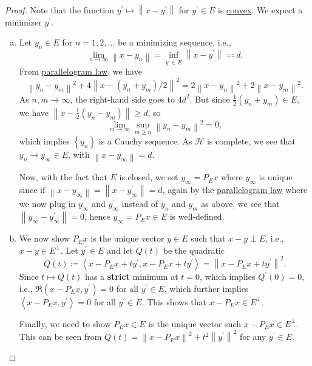 \begin{proof}
	Note that the function \(y^\prime \mapsto \left\lVert x - y^\prime \right\rVert \) for \(y^\prime \in E\) is \hyperref[def:convex-function]{convex}. We expect a minimizer \(y^\prime \).
	\begin{enumerate}[(a)]
		\item Let \(y_n\in E\) for \(n = 1, 2, \dots  \) be a minimizing sequence, i.e.,
		      \[
			      \lim\limits_{n \to \infty} \left\lVert x - y_n\right\rVert = \inf _{y^\prime \in E}\left\lVert x - y^\prime \right\rVert \eqqcolon d.
		      \]
		      From \hyperref[lma:parallelogram-law]{parallelogram law}, we have
		      \[
			      \left\lVert y_{n} - y_{m} \right\rVert^{2} + 4 \left\lVert x - (y_{n} + y_{m} ) / 2\right\rVert ^{2} = 2\left\lVert x - y_{n} \right\rVert ^{2} + 2\left\lVert x- y_{m} \right\rVert ^{2}.
		      \]
		      As \(n, m\to \infty \), the right-hand side goes to \(4d^{2} \). But since \(\frac{1}{2}(y_{n} + y_{m} )\in E\), we have \(\left\lVert x - \frac{1}{2}(y_{n} - y_{m} )\right\rVert \geq d\), so
		      \[
			      \lim\limits_{m \to \infty} \sup _{m \geq n}\left\lVert y_{n} - y_{m} \right\rVert^{2} = 0,
		      \]
		      which implies \(\left\{ y_{n}  \right\} \) is a Cauchy sequence. As \(\mathcal{H} \) is complete, we see that \(y_{n} \to y_{\infty }\in E\), with \(\left\lVert x - y_{\infty }\right\rVert=d \).

		      Now, with the fact that \(E\) is closed, we set \(y_\infty = P_E x\) where \(y_\infty \) is unique since if \(\left\lVert x - y_\infty \right\rVert = \left\lVert x - y^\prime _\infty \right\rVert = d \), again by the \hyperref[lma:parallelogram-law]{parallelogram law} where we now plug in \(y_\infty \) and \(y_\infty ^\prime \) instead of \(y_{n} \) and \(y_{m} \) as above, we see that \(\left\lVert y_\infty - y^\prime _\infty \right\rVert = 0\), hence \(y_\infty = P_E x \in E\) is well-defined.

		\item We now show \(P_E x\) is the unique vector \(y\in E\) such that \(x - y\perp E\), i.e., \(x-y\in E^\perp\). Let \(y^\prime \in E\) and let \(Q(t)\) be the quadratic
		      \[
			      Q(t)\coloneqq \left\langle x-P_E x + ty^\prime , x - P_E x + ty^\prime  \right\rangle = \left\lVert x - P_E x + ty^\prime \right\rVert ^{2}.
		      \]
		      Since \(t\mapsto Q(t)\) has a \textbf{strict} minimum at \(t = 0\), which implies \(Q^\prime (0) = 0\), i.e., \(\Re \left( x-P_E x, y^\prime  \right) = 0\) for all \(y^\prime \in E\), which further implies \(\left\langle x-P_E x, y^\prime  \right\rangle= 0\) for all \(y^\prime \in E\). This shows that \(x - P_E x\in E^{\perp}\).

		      Finally, we need to show \(P_E x\in E\) is the unique vector such \(x - P_E x\in E^\perp\). This can be seen from \(Q(t)=\left\lVert x - P_E x\right\rVert^{2} + t^{2} \left\lVert y^\prime \right\rVert^{2}\) for any \(y^\prime \in E\).
	\end{enumerate}
\end{proof}

